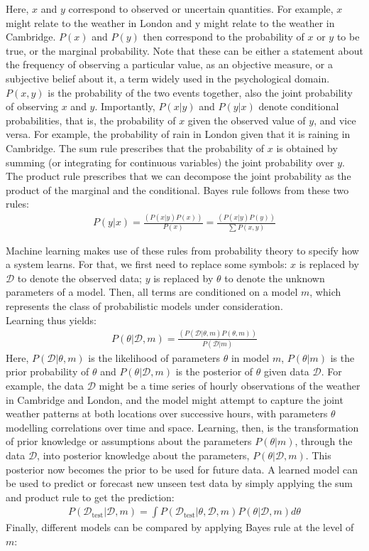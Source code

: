 \documentclass[oneside, 11pt]{book}
\begin{document}
Here, $x$ and $y$ correspond to observed or uncertain quantities. For example, $x$ might relate to the weather in London and y might relate to the weather in Cambridge. $P(x)$ and $P(y)$ then correspond to the probability of $x$ or $y$ to be true, or the marginal probability. Note that these can be either a statement about the frequency of observing a particular value, as an objective measure, or a subjective belief about it, a term widely used in the psychological domain. $P(x,y)$ is the probability of the two events together, also the joint probability of observing $x$ and $y$. Importantly, $P(x|y)$ and $P(y|x)$ denote conditional probabilities, that is, the probability of $x$ given the observed value of $y$, and vice versa. For example, the probability of rain in London given that it is raining in Cambridge. The sum rule prescribes that the probability of $x$ is obtained by summing (or integrating for continuous variables) the joint probability over $y$. The product rule prescribes that we can decompose the joint probability as the product of the marginal and the conditional. Bayes rule follows from these two rules: 
\begin{align}
P(y|x) = \frac{(P(x|y) P(x))}{P(x)} = \frac{(P(x|y) P(y))} {\sum P(x,y)}
\end{align}

Machine learning makes use of these rules from probability theory to specify how a system learns. For that, we first need to replace some symbols: $x$ is replaced by $\mathcal{D}$ to denote the observed data; $y$ is replaced by $\theta$ to denote the unknown parameters of a model. Then, all terms are conditioned on a model $m$, which represents the class of probabilistic models under consideration. \\
Learning thus yields: 
\begin{align}
P(\theta |\mathcal{D},m) = \frac{(P(\mathcal{D}|\theta,m) P(\theta,m))}{P(\mathcal{D}|m)}
\end{align}
Here, $P(\mathcal{D}|\theta,m)$ is the likelihood of parameters $\theta$ in model $m$, $P(\theta|m)$ is the prior probability of $\theta$ and $P(\theta|\mathcal{D}, m)$ is the posterior of $\theta$ given data $\mathcal{D}$. For example, the data $\mathcal{D}$ might be a time series of hourly observations of the weather in Cambridge and London, and the model might attempt to capture the joint weather patterns at both locations over successive hours, with parameters $\theta$ modelling correlations over time and space. Learning, then, is the transformation of prior knowledge or assumptions about the parameters $P(\theta|m)$, through the data $\mathcal{D}$, into posterior knowledge about the parameters, $P(\theta|\mathcal{D},m)$. This posterior now becomes the prior to be used for future data. A learned model can be used to predict or forecast new unseen test data by simply applying the sum and product rule to get the prediction: 
\begin{align}
P(\mathcal{D}_{\text{test}}|\mathcal{D},m) = \int P(\mathcal{D}_{\text{test}}| \theta,\mathcal{D},m) P(\theta|\mathcal{D},m)d \theta
\end{align}
Finally, different models can be compared by applying Bayes rule at the level of $m$: 
\end{document}
